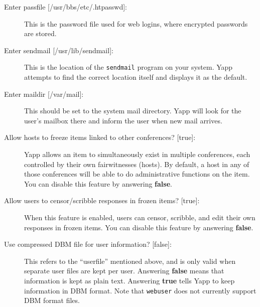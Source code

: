 \documentclass[twoside]{report}
\begin{document}
\begin{enumerate}
\begin{description}
      \item[{Enter passfile [/usr/bbs/etc/.htpasswd]:}] 
         \mbox{}\newline
         This is the password file used for web logins, where encrypted 
         passwords are stored.

      \item[{Enter sendmail [/usr/lib/sendmail]:}]  
         \mbox{}\newline
         This is the location of the {\tt sendmail} program on your system.  
         Yapp attempts to find the correct location itself and displays it 
         as the default.

      \item[{Enter maildir [/var/mail]:}] 
         \mbox{}\newline
         This should be set to the system mail directory.  Yapp will look 
         for the user's mailbox there and inform the user when new mail 
         arrives.

      \item[{Allow hosts to freeze items linked to other conferences? [true]:}]
         \mbox{}\newline
         Yapp allows an item to simultaneously exist in multiple conferences,
         each controlled by their own fairwitnesses (hosts).  By default,
         a host in any of those conferences will be able to do administrative
         functions on the item.  You can disable this feature by answering 
         {\bf false}.

      \item[{Allow users to censor/scribble responses in frozen items? [true]:}]
         \mbox{}\newline
         When this feature is enabled, users can censor, scribble, and edit
         their own responses in frozen items.  You can disable this feature 
         by answering {\bf false}.

      \item[{Use compressed DBM file for user information? [false]:}]
         \mbox{}\newline
         This refers to the ``userfile'' mentioned above, and is only valid
         when separate user files are kept per user.  Answering {\bf false}
         means that information is kept as plain text.  Answering {\bf true}
         tells Yapp to keep information in DBM format.  Note that 
         {\tt webuser} does not currently support DBM 
         format files.


\end{description}
\end{enumerate}
\end{document}
